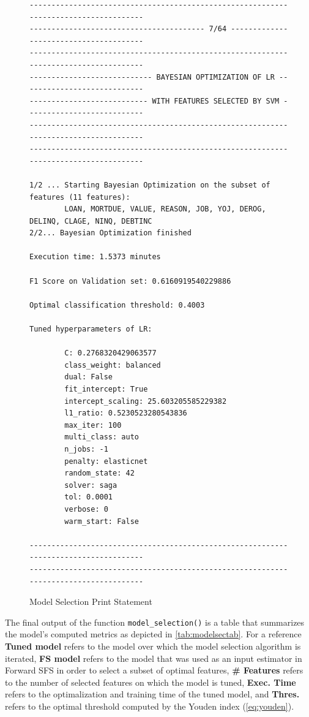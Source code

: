 \begin{figure}[H]
\centering\caption{Model Selection Print Statement}
\label{fig:modselprint}

{\fontsize{8.8}{11}\selectfont 
\begin{verbatim}
-------------------------------------------------------------------------------------
---------------------------------------- 7/64 ---------------------------------------
-------------------------------------------------------------------------------------
---------------------------- BAYESIAN OPTIMIZATION OF LR ----------------------------
--------------------------- WITH FEATURES SELECTED BY SVM ---------------------------
-------------------------------------------------------------------------------------
------------------------------------------------------------------------------------- 

1/2 ... Starting Bayesian Optimization on the subset of features (11 features):
        LOAN, MORTDUE, VALUE, REASON, JOB, YOJ, DEROG, DELINQ, CLAGE, NINQ, DEBTINC
2/2... Bayesian Optimization finished 

Execution time: 1.5373 minutes 

F1 Score on Validation set: 0.6160919540229886 

Optimal classification threshold: 0.4003

Tuned hyperparameters of LR: 

        C: 0.2768320429063577
        class_weight: balanced
        dual: False
        fit_intercept: True
        intercept_scaling: 25.603205585229382
        l1_ratio: 0.5230523280543836
        max_iter: 100
        multi_class: auto
        n_jobs: -1
        penalty: elasticnet
        random_state: 42
        solver: saga
        tol: 0.0001
        verbose: 0
        warm_start: False
        
-------------------------------------------------------------------------------------
-------------------------------------------------------------------------------------
\end{verbatim}
}
\vspace{0em}
\end{figure}


\newpage



The final output of the function \lstinline{model_selection()} is a table that summarizes the model's computed metrics as depicted in \autoref{tab:modelsectab}.
For a reference \textbf{Tuned model} refers to the model over which the model selection algorithm is iterated, \textbf{FS model} refers to the model that was used as an input estimator in Forward SFS in order to select a subset of optimal features,
\textbf{\# Features} refers to the number of selected features on which the model is tuned, \textbf{Exec. Time} refers to the optimalization and training time of the tuned model, and \textbf{Thres.} refers to the optimal threshold computed by the Youden index (\autoref{eq:youden}).


